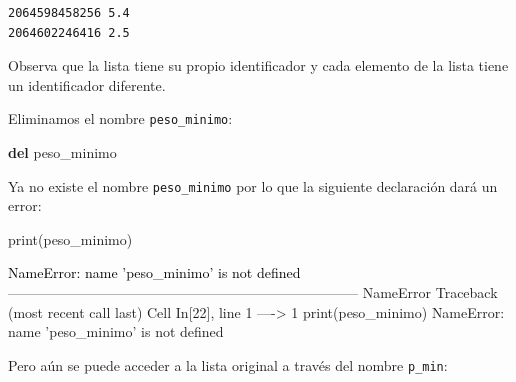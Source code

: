 \documentclass[
  spanish,
  letterpaper,
]{scrbook}
\newenvironment{Shaded}{\begin{snugshade}}{\end{snugshade}}
\newcommand{\BuiltInTok}[1]{\textcolor[rgb]{0.00,0.23,0.31}{#1}}
\newcommand{\KeywordTok}[1]{\textcolor[rgb]{0.00,0.23,0.31}{\textbf{#1}}}
\newcommand{\NormalTok}[1]{\textcolor[rgb]{0.00,0.23,0.31}{#1}}
\theoremstyle{definition}
\theoremstyle{remark}
\begin{document}
\begin{verbatim}
2064598458256 5.4
2064602246416 2.5
\end{verbatim}

Observa que la lista tiene su propio identificador y cada elemento de la
lista tiene un identificador diferente.

Eliminamos el nombre \texttt{peso\_minimo}:

\begin{Shaded}
\begin{Highlighting}[]
\KeywordTok{del}\NormalTok{ peso\_minimo }
\end{Highlighting}
\end{Shaded}

Ya no existe el nombre \texttt{peso\_minimo} por lo que la siguiente
declaración dará un error:

\begin{Shaded}
\begin{Highlighting}[]
\BuiltInTok{print}\NormalTok{(peso\_minimo) }
\end{Highlighting}
\end{Shaded}

\begin{Highlighting}
\textcolor{black}{NameError: name 'peso\_minimo' is not defined}
\textcolor{black}{}\textcolor{QuartoInternalColor1}{---------------------------------------------------------------------------}\textcolor{QuartoInternalColor2}{}
\textcolor{QuartoInternalColor2}{}\textcolor{QuartoInternalColor1}{NameError}\textcolor{QuartoInternalColor2}{                                 Traceback (most recent call last)}
\textcolor{QuartoInternalColor2}{}\textcolor{QuartoInternalColor3}{Cell}\textcolor{QuartoInternalColor2}{}\textcolor{QuartoInternalColor3}{ }\textcolor{QuartoInternalColor2}{}\textcolor{QuartoInternalColor4}{In[22]}\textcolor{QuartoInternalColor2}{}\textcolor{QuartoInternalColor4}{, line 1}\textcolor{QuartoInternalColor2}{}
\textcolor{QuartoInternalColor2}{}\textcolor{QuartoInternalColor4}{----> }\textcolor{QuartoInternalColor2}{}\textcolor{QuartoInternalColor4}{1}\textcolor{QuartoInternalColor2}{ }\textcolor{QuartoInternalColor5}{print}\textcolor{QuartoInternalColor2}{(}\textcolor{QuartoInternalColor2}{peso\_minimo}\textcolor{QuartoInternalColor2}{) }
\textcolor{QuartoInternalColor2}{}\textcolor{QuartoInternalColor1}{NameError}\textcolor{QuartoInternalColor2}{: name 'peso\_minimo' is not defined}
\end{Highlighting}

Pero aún se puede acceder a la lista original a través del nombre
\texttt{p\_min}:
\end{document}

